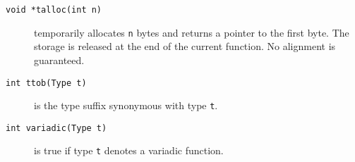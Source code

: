 \begin{description}
\item[{\tt void *talloc(int n)}] temporarily allocates \verb|n| bytes and returns
a pointer to the first byte. The storage is released at the end of
the current function.  No alignment is guaranteed.

\item[{\tt int ttob(Type t)}] is the type suffix synonymous with type \verb|t|.

\item[{\tt int variadic(Type t)}] is true if type \verb|t| denotes a variadic function.

\end{description}


